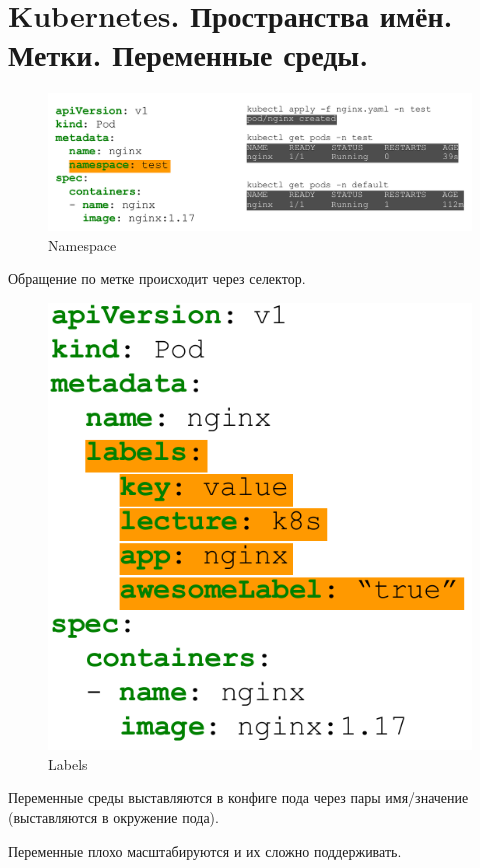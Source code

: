 \section{Kubernetes. Пространства имён. Метки. Переменные среды.}


\begin{figure}[H]
	\centering
	\begin{minipage}[b]{0.8\textwidth}
		\includegraphics[width=\textwidth]{images/ns.png}
        \caption{Namespace}
	\end{minipage}
\end{figure}


Обращение по метке происходит через селектор.

\begin{figure}[H]
	\centering
	\begin{minipage}[b]{0.3\textwidth}
		\includegraphics[width=\textwidth]{images/lab.png}
        \caption{Labels}
	\end{minipage}
\end{figure}

Переменные среды выставляются в конфиге пода через пары имя/значение
(выставляются в окружение пода).

Переменные плохо масштабируются и их сложно поддерживать.